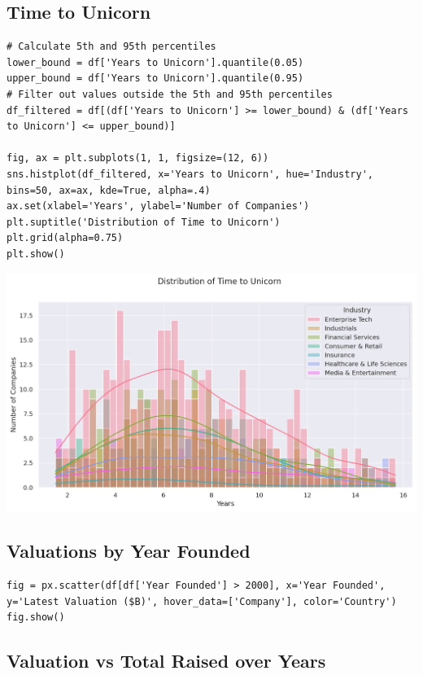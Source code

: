 \documentclass[a4paper,12pt]{article}
\begin{document}
\subsection{Time to Unicorn}
\label{sec:org1c66712}

\begin{verbatim}
# Calculate 5th and 95th percentiles
lower_bound = df['Years to Unicorn'].quantile(0.05)
upper_bound = df['Years to Unicorn'].quantile(0.95)
# Filter out values outside the 5th and 95th percentiles
df_filtered = df[(df['Years to Unicorn'] >= lower_bound) & (df['Years to Unicorn'] <= upper_bound)]

fig, ax = plt.subplots(1, 1, figsize=(12, 6))
sns.histplot(df_filtered, x='Years to Unicorn', hue='Industry', bins=50, ax=ax, kde=True, alpha=.4)
ax.set(xlabel='Years', ylabel='Number of Companies')
plt.suptitle('Distribution of Time to Unicorn')
plt.grid(alpha=0.75)
plt.show()
\end{verbatim}

\begin{center}
\includegraphics[width=.9\linewidth]{./.ob-jupyter/3c56a433ece1ec2cf4e83e3ba320a0aee5c2ee70.png}
\label{}
\end{center}
\subsection{Valuations by Year Founded}
\label{sec:org718d6d1}

\begin{verbatim}
fig = px.scatter(df[df['Year Founded'] > 2000], x='Year Founded', y='Latest Valuation ($B)', hover_data=['Company'], color='Country')
fig.show()
\end{verbatim}
\subsection{Valuation vs Total Raised over Years}
\label{sec:orge4492ac}
\end{document}
